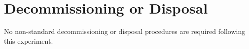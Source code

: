 \section{Decommissioning or Disposal}
No non-standard decommissioning or disposal procedures are required following this experiment.

 



